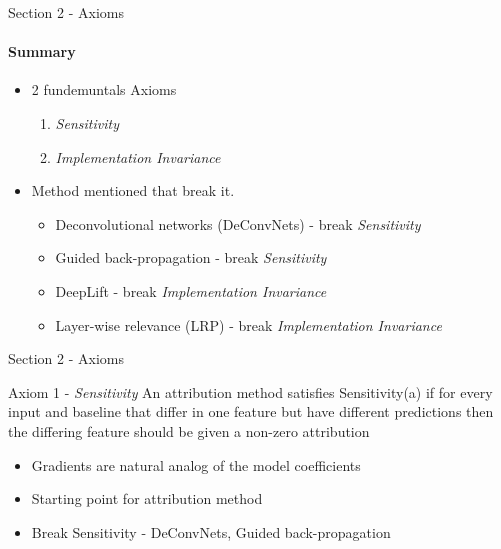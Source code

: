 \documentclass[serif]{beamer}
\begin{document}
\begin{frame}{Section 2 - Axioms}
	\framesubtitle{Summary}
	\begin{itemize}
		\item 2 fundemuntals Axioms
		\begin{enumerate}
			\item \textit{Sensitivity}
			\item \textit{Implementation Invariance}
		\end{enumerate}
		
		\item Method mentioned that break it.
		\begin{itemize}
			\item Deconvolutional networks (DeConvNets) - break \textit{Sensitivity}
			\item Guided back-propagation - break \textit{Sensitivity}
			\item DeepLift - break \textit{Implementation Invariance}
			\item Layer-wise relevance (LRP) - break \textit{Implementation Invariance}
		\end{itemize}
	\end{itemize}
\end{frame}

\begin{frame}{Section 2 - Axioms}		
	\begin{block}{Axiom 1 - \textit{Sensitivity}}
		An attribution method satisfies Sensitivity(a) if for every
		input and baseline that differ in one feature but have different
		predictions then the differing feature should be given
		a non-zero attribution
	\end{block}	
	\begin{itemize}
		\item Gradients are natural analog of the model coefficients
		\item Starting point for attribution method
		\item Break Sensitivity - DeConvNets, Guided back-propagation
\end{itemize}

\end{frame}
\end{document}
